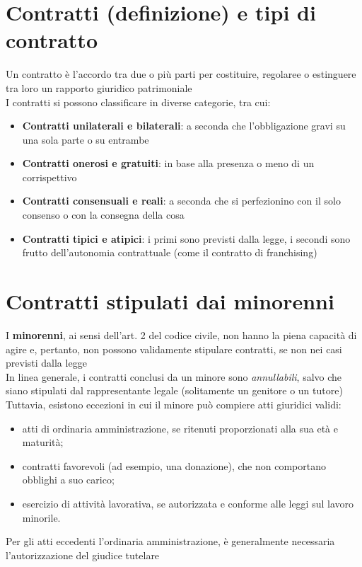 \documentclass[8pt,oneside,a4paper]{article}
\begin{document}
	\section{Contratti (definizione) e tipi di contratto}
	Un contratto è l'accordo tra due o più parti per costituire, regolaree o estinguere tra loro un rapporto giuridico patrimoniale\\
	I contratti si possono classificare in diverse categorie, tra cui:
	\begin{itemize}
		\item \textbf{Contratti unilaterali e bilaterali}: a seconda che l'obbligazione gravi su una sola parte o su entrambe
		\item \textbf{Contratti onerosi e gratuiti}: in base alla presenza o meno di un corrispettivo
		\item \textbf{Contratti consensuali e reali}: a seconda che si perfezionino con il solo consenso o con la consegna della cosa
		\item \textbf{Contratti tipici e atipici}: i primi sono previsti dalla legge, i secondi sono frutto dell'autonomia contrattuale (come il contratto di franchising)
	\end{itemize}
	\section{Contratti stipulati dai minorenni}
	I \textbf{minorenni}, ai sensi dell'art. 2 del codice civile, non hanno la piena capacità di agire e, pertanto, non possono validamente stipulare contratti, se non nei casi previsti dalla legge\\
	In linea generale, i contratti conclusi da un minore sono \textit{annullabili}, salvo che siano stipulati dal rappresentante legale (solitamente un genitore o un tutore)\\
	Tuttavia, esistono eccezioni in cui il minore può compiere atti giuridici validi:
	\begin{itemize}
		\item atti di ordinaria amministrazione, se ritenuti proporzionati alla sua età e maturità;
		\item contratti favorevoli (ad esempio, una donazione), che non comportano obblighi a suo carico;
		\item esercizio di attività lavorativa, se autorizzata e conforme alle leggi sul lavoro minorile.
	\end{itemize}
	Per gli atti eccedenti l’ordinaria amministrazione, è generalmente necessaria l’autorizzazione del giudice tutelare
\end{document}
